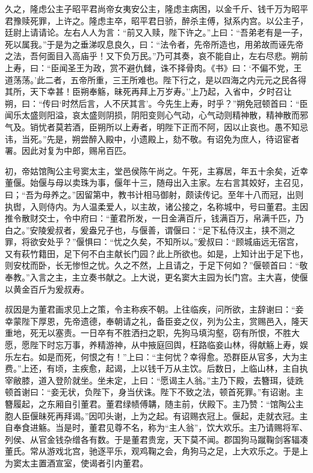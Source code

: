 \documentclass[]{article}
\begin{document}
久之，隆虑公主子昭平君尚帝女夷安公主，隆虑主病困，以金千斤、钱千万为昭平君豫赎死罪，上许之。隆虑主卒，昭平君日骄，醉杀主傅，狱系内宫。以公主子，廷尉上请请论。左右人人为言：``前又入赎，陛下许之。''上曰：``吾弟老有是一子，死以属我。''于是为之垂涕叹息良久，曰：``法令者，先帝所造也，用弟故而诬先帝之法，吾何面目入高庙乎！又下负万民。''乃可其奏，哀不能自止，左右尽悲。朔前上寿，曰：``臣闻圣王为政，赏不避仇雠，诛不择骨肉。《书》曰：`不偏不党，王道荡荡。'此二者，五帝所重，三王所难也。陛下行之，是以四海之内元元之民各得其所，天下幸甚！臣朔奉觞，昧死再拜上万岁寿。''上乃起，入省中，夕时召让朔，曰：``传曰`时然后言，人不厌其言'。今先生上寿，时乎？''朔免冠顿首曰：``臣闻乐太盛则阳溢，哀太盛则阴损，阴阳变则心气动，心气动则精神散，精神散而邪气及。销忧者莫若酒，臣朔所以上寿者，明陛下正而不阿，因以止哀也。愚不知忌讳，当死。''先是，朔尝醉入殿中，小遗殿上，劾不敬。有诏免为庶人，待诏宦者署。因此对复为中郎，赐帛百匹。

初，帝姑馆陶公主号窦太主，堂邑侯陈午尚之。午死，主寡居，年五十余矣，近幸董偃。始偃与母以卖珠为事，偃年十三，随母出入主家。左右言其姣好，主召见，曰；``吾为母养之。''因留第中，教书计相马御射，颇读传记。至年十八而冠，出则执辔，入则侍内。为人温柔爱人，以主故，诸公接之，名称城中，号曰董君。主因推令散财交士，令中府曰：``董君所发，一日金满百斤，钱满百万，帛满千匹，乃白之。''安陵爰叔者，爰盎兄子也，与偃善，谓偃曰：``足下私侍汉主，挟不测之罪，将欲安处乎？''偃惧曰：``忧之久矣，不知所以。''爰叔曰：``顾城庙远无宿宫，又有萩竹籍田，足下何不白主献长门园？此上所欲也。如是，上知计出于足下也，则安枕而卧，长无惨怛之忧。久之不然，上且请之，于足下何如？''偃顿首曰：``敬奉教。''入言之主，主立奏书献之。上大说，更名窦大主园为长门宫。主大喜，使偃以黄金百斤为爰叔寿。

叔因是为董君画求见上之策，令主称疾不朝。上往临疾，问所欲，主辞谢曰：``妾幸蒙陛下厚恩，先帝遗德，奉朝请之礼，备臣妾之仪，列为公主，赏赐邑入，隆天重地，死无以塞责。一日卒有不胜洒扫之职，先狗马填沟壑，窃有所恨，不胜大愿，愿陛下时忘万事，养精游神，从中掖庭回舆，枉路临妾山林，得献觞上寿，娱乐左右。如是而死，何恨之有！''上曰：``主何忧？幸得愈。恐群臣从官多，大为主费。''上还，有顷，主疾愈，起谒，上以钱千万从主饮。后数日，上临山林，主自执宰敝膝，道入登阶就坐。坐未定，上曰：``愿谒主人翁。''主乃下殿，去簪珥，徒跣顿首谢曰：``妾无状，负陛下，身当伏诛。陛下不致之法，顿首死罪。''有诏谢。主簪履起，之东厢自引董君。董君绿帻傅韝，随主前，伏殿下。主乃赞：``馆陶公主胞人臣偃昧死再拜谒。''因叩头谢，上为之起。有诏赐衣冠上。偃起，走就衣冠。主自奉食进觞。当是时，董君见尊不名，称为``主人翁''，饮大欢乐。主乃请赐将军、列侯、从官金钱杂缯各有数。于是董君贵宠，天下莫不闻。郡国狗马蹴鞠剑客辐凑董氏。常从游戏北宫，驰逐平乐，观鸡鞠之会，角狗马之足，上大欢乐之。于是上为窦太主置酒宣室，使谒者引内董君。
\end{document}

